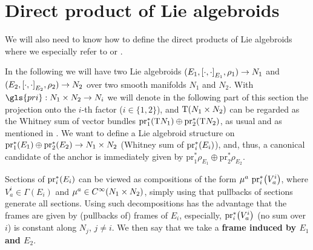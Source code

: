 \section{Direct product of Lie algebroids}\label{DirectProdsOfLieAlgoids}

We will also need to know how to define the direct products of Lie algebroids where we especially refer to \cite[Lemma 6.25]{meinrenkenlie} or \cite[beginning of \S 4.2; page 155]{mackenzieGeneralTheory}.

In the following we will have two Lie algebroids $(E_1, \mleft[ \cdot, \cdot \mright]_{E_1}, \rho_1) \to N_1$ and $(E_2, \mleft[ \cdot, \cdot \mright]_{E_2}, \rho_2) \to N_2$ over two smooth manifolds $N_1$ and $N_2$. With $\gls{pri}: N_1 \times N_2 \to N_i$ we will denote in the following part of this section the projection onto the $i$-th factor ($i \in \{1,2\}$), and $\mathrm{T}\mleft( N_1 \times N_2 \mright)$ can be regarded as the Whitney sum of vector bundles $\mathrm{pr}_1^*\mleft( \mathrm{T}N_1 \mright) \oplus \mathrm{pr}_2^*\mleft( \mathrm{T}N_2 \mright)$, as usual and as mentioned in \cite{mackenzieGeneralTheory}. We want to define a Lie algebroid structure on $\mathrm{pr}_1^*\mleft( E_1 \mright) \oplus \mathrm{pr}_2^*\mleft( E_2 \mright) \to N_1 \times N_2$ (Whitney sum of $\mathrm{pr}_i^*\mleft( E_i \mright)$), and, thus, a canonical candidate of the anchor is immediately given by $\mathrm{pr}_1^*\rho_{E_1} \oplus \mathrm{pr}_2^*\rho_{E_2}$.

Sections of $\mathrm{pr}_i^*\mleft( E_i \mright)$ can be viewed as compositions of the form $\mu^a ~ \mathrm{pr}_i^*\mleft( V^i_a \mright)$, where $V^i_a \in \Gamma(E_i)$ and $\mu^a \in C^\infty\mleft( N_1 \times N_2 \mright)$, simply using that pullbacks of sections generate all sections. Using such decompositions has the advantage that the frames are given by (pullbacks of) frames of $E_i$, especially, $\mathrm{pr}_i^*\mleft( V^i_a \mright)$ (no sum over $i$) is constant along $N_j$, $j \neq i$. We then say that we take a \textbf{frame induced by $E_1$ and $E_2$}.

